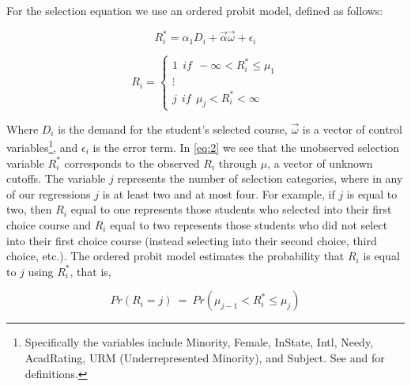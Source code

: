 For the selection equation we use an ordered probit model, defined as follows:

\setlength{\belowdisplayskip}{5pt} \setlength{\belowdisplayshortskip}{1pt}
\setlength{\abovedisplayskip}{-6pt} \setlength{\abovedisplayshortskip}{1pt}

\begin{equation}\label{eq:1}
R_{i}^{*} = \alpha_{1} D_{i} + \overrightarrow{\alpha} \overrightarrow{\omega} + \epsilon_{i}
\end{equation}

\setlength{\belowdisplayskip}{11pt} \setlength{\belowdisplayshortskip}{1pt}
\setlength{\abovedisplayskip}{-4pt} \setlength{\abovedisplayshortskip}{1pt}

\begin{equation}\label{eq:2}
R_{i} = 
\begin{cases}
  1 \ \ if \ \ - \infty < R_{i}^{*} \leq \mu_{1} \\
  \vdots \\
  j \ \ if \ \ \mu_{j} < R_{i}^{*} < \infty
\end{cases}
\end{equation}

Where $D_{i}$ is the demand for the student's selected course, $\overrightarrow{\omega}$ is a vector of control variables\footnote{Specifically the variables include Minority, Female, InState, Intl, Needy, AcadRating, URM (Underrepresented Minority), and Subject. See  and  for definitions.}, and $\epsilon_{i}$ is the error term. 
In \eqref{eq:2} we see that the unobserved selection variable $R_{i}^{*}$ corresponds to the observed $R_{i}$ through $\mu$, a vector of unknown cutoffs. 
The variable $j$ represents the number of selection categories, where in any of our regressions $j$ is at least two and at most four. 
For example, if $j$ is equal to two, then $R_{i}$ equal to one represents those students who selected into their first choice course and $R_{i}$ equal to two represents those students who did not select into their first choice course (instead selecting into their second choice, third choice, etc.). 
The ordered probit model estimates the probability that $R_{i}$ is equal to $j$ using $R_{i}^{*}$, that is, 

\setlength{\belowdisplayskip}{5pt} \setlength{\belowdisplayshortskip}{1pt}
\setlength{\abovedisplayskip}{-4pt} \setlength{\abovedisplayshortskip}{1pt}

\begin{equation}\label{eq:3}
Pr(R_{i} = j) \ = \ Pr(\mu_{j-1} < R_{i}^{*} \leq \mu_{j})
\end{equation}

